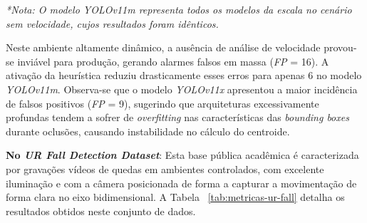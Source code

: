 \documentclass[12pt]{article}
\begin{document}
\setcounter{table}{0}
\begin{table}[h!]
\centering
\small
\caption{Métricas de detecção: Desempenho no \textit{Dataset} Simulado.}
\label{tab:metricas-meu-dataset}
\textit{*Nota: O modelo YOLOv11m representa todos os modelos da escala no cenário sem velocidade, cujos resultados foram idênticos.}
\end{table}

Neste ambiente altamente dinâmico, a ausência de análise de velocidade provou-se inviável para produção,
gerando alarmes falsos em massa (\textit{FP} = 16). A ativação da heurística reduziu drasticamente esses
erros para apenas 6 no modelo \textit{YOLOv11m}. Observa-se que o modelo \textit{YOLOv11x} apresentou a 
maior incidência de falsos positivos (\textit{FP} = 9), sugerindo que arquiteturas excessivamente profundas 
tendem a sofrer de \textit{overfitting} nas características das \textit{bounding boxes} durante oclusões, 
causando instabilidade no cálculo do centroide.

    
\textbf{No \textit{UR Fall Detection Dataset}}: Esta base pública acadêmica é caracterizada por gravações
vídeos de quedas em ambientes controlados, com excelente iluminação e com a câmera posicionada de forma a
capturar a movimentação de forma clara no eixo bidimensional. A Tabela ~\ref{tab:metricas-ur-fall} detalha
os resultados obtidos neste conjunto de dados.
\end{document}
